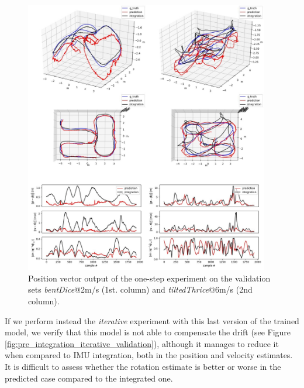 \begin{figure}[h]
   \centering
   \includegraphics[width=0.95\textwidth]{thesis_template/img/pre_integration_p3d_best.jpg}
   \caption{Position vector output of the one-step experiment on the validation sets \emph{bentDice}@2m/s (1st. column) and \emph{tiltedThrice}@6m/s (2nd column).}
   \label{fig:pre_integration_p3d_best}
\end{figure}

If we perform instead the \emph{iterative} experiment with this last version of the trained model, we verify that this model is not able to compensate the drift (see Figure \ref{fig:pre_integration_iterative_validation}), although it manages to reduce it when compared to IMU integration, both in the position and velocity estimates.
It is difficult to assess whether the rotation estimate is better or worse in the predicted case compared to the integrated one.

